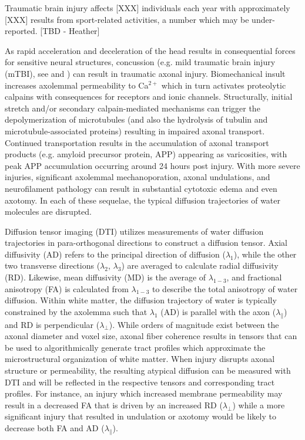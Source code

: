 \documentclass[12pt]{article}
\begin{document}
Traumatic brain injury affects [XXX] individuals each year with approximately [XXX] results from sport-related activities, a number which may be under-reported. [TBD - Heather]

As rapid acceleration and deceleration of the head results in consequential forces for sensitive neural structures, concussion (e.g. mild traumatic brain injury (mTBI), see \textcite{mayer2017SpectrumMildTraumatic} and \textcite{silverberg2023AmericanCongressRehabilitation}) can result in traumatic axonal injury. Biomechanical insult increases axolemmal permeability to Ca$^{2+}$ which in turn activates proteolytic calpains with consequences for receptors and ionic channels. Structurally, initial stretch and/or secondary calpain-mediated mechanisms can trigger the depolymerization of microtubules (and also the hydrolysis of tubulin and microtubule-associated proteins) resulting in impaired axonal transport. Continued transportation results in the accumulation of axonal transport products (e.g. amyloid precursor protein, APP) appearing as varicosities, with peak APP accumulation occurring around 24 hours post injury. With more severe injuries, significant axolemmal mechanoporation, axonal undulations, and neurofilament pathology can result in substantial cytotoxic edema and even axotomy. In each of these sequelae, the typical diffusion trajectories of water molecules are disrupted.

Diffusion tensor imaging (DTI) utilizes measurements of water diffusion trajectories in para-orthogonal directions to construct a diffusion tensor. Axial diffusivity (AD) refers to the principal direction of diffusion ($\lambda_1$), while the other two transverse directions ($\lambda_2$, $\lambda_3$) are averaged to calculate radial diffusivity (RD). Likewise, mean diffusivity (MD) is the average of $\lambda_{1-3}$, and fractional anisotropy (FA) is calculated from $\lambda_{1-3}$ to describe the total anisotropy of water diffusion. Within white matter, the diffusion trajectory of water is typically constrained by the axolemma such that $\lambda_1$ (AD) is parallel with the axon ($\lambda_\parallel$) and RD is perpendicular ($\lambda_\perp$). While orders of magnitude exist between the axonal diameter and voxel size, axonal fiber coherence results in tensors that can be used to algorithmically generate tract profiles which approximate the microstructural organization of white matter. When injury disrupts axonal structure or permeability, the resulting atypical diffusion can be measured with DTI and will be reflected in the respective tensors and corresponding tract profiles. For instance, an injury which increased membrane permeability may result in a decreased FA that is driven by an increased RD ($\lambda_\perp$) while a more significant injury that resulted in undulation or axotomy would be likely to decrease both FA and AD ($\lambda_\parallel$).
\end{document}
